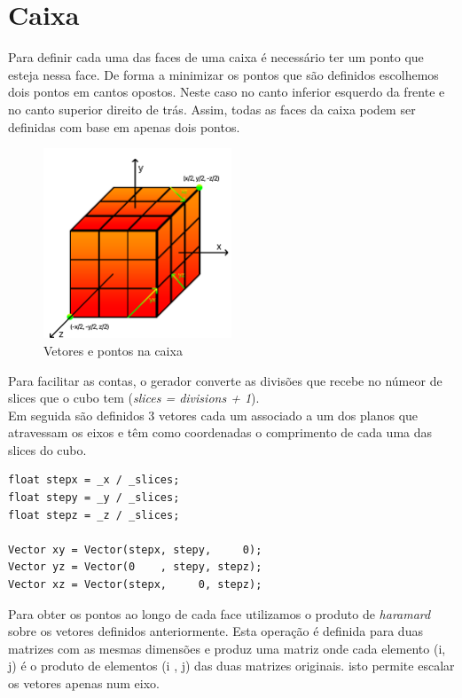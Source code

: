 \documentclass[a4paper]{report}
\begin{document}
\section{Caixa}
Para definir cada uma das faces de uma caixa é necessário ter um ponto que
esteja nessa face. De forma a minimizar os pontos que são definidos escolhemos
dois pontos em cantos opostos. Neste caso no canto inferior esquerdo da frente e
no canto superior direito de trás. Assim, todas as faces da caixa podem ser
definidas com base em apenas dois pontos.\\
\begin{figure}[H]
    \centering 
    \includegraphics[width=0.5\textwidth]{images/cubo_vectors.png}  
    \caption{Vetores e pontos na caixa}
    \label{fig:box_vectors}
\end{figure}
Para facilitar as contas, o gerador converte as divisões que recebe no númeor de
slices que o cubo tem (\textit{slices = divisions + 1}).\\
Em seguida são definidos 3 vetores cada um associado a um dos planos que
atravessam os eixos e têm como coordenadas o comprimento de cada uma das slices
do cubo.\\
\begin{lstlisting}
float stepx = _x / _slices;
float stepy = _y / _slices;
float stepz = _z / _slices;

Vector xy = Vector(stepx, stepy,     0);
Vector yz = Vector(0    , stepy, stepz);
Vector xz = Vector(stepx,     0, stepz);
\end{lstlisting}
Para obter os pontos ao longo de cada face utilizamos o produto de
\textit{haramard} sobre os vetores definidos anteriormente. Esta operação é
definida para duas matrizes com as mesmas dimensões e produz uma matriz onde
cada elemento (i, j) é o produto de elementos (i , j) das duas matrizes
originais. isto permite escalar os vetores apenas num eixo.\\
\end{document}
